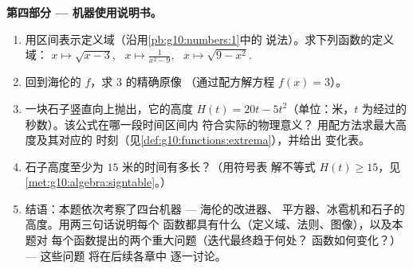 \begin{problem}
\medskip
\noindent\textbf{第四部分 --- 机器使用说明书。}
\begin{enumerate}[resume]
  \item 用区间表示定义域（沿用\cref{pb:g10:numbers:1}中的
        说法）。求下列函数的定义域：
        $x \mapsto \sqrt{x - 3}$, \
        $x \mapsto \frac{1}{x^2 - 9}$, \
        $x \mapsto \sqrt{9 - x^2}$.
  \item 回到海伦的 $f$，求 $3$ 的精确原像
        （通过配方解方程 $f(x) = 3$）。
  \item 一块石子竖直向上抛出，它的高度
        $H(t) = 20t - 5t^2$（单位：米，$t$ 为经过的秒数）。该公式在哪一段时间区间内
        符合实际的物理意义？
        用配方法求最大高度及其对应的
        时刻（见\cref{def:g10:functions:extrema}），并给出
        变化表。
  \item 石子高度至少为 $15$ 米的时间有多长？（用符号表
        解不等式 $H(t) \geq 15$，见
        \cref{met:g10:algebra:signtable}。）
  \item 结语：本题依次考察了四台机器 --- 海伦的改进器、
        平方器、冰雹机和石子的高度。用两三句话说明每个
        函数都具有什么（定义域、法则、图像），以及本题对
        每个函数提出的两个重大问题（迭代最终趋于何处？
        函数如何变化？） --- 这些问题
        将在后续各章中
        逐一讨论。
\end{enumerate}
\end{problem}
